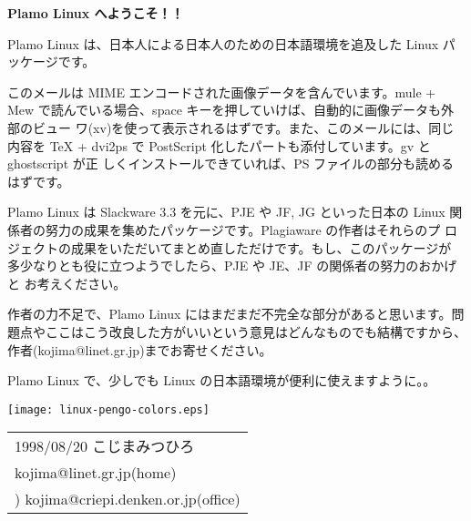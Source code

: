 \documentclass{jarticle}
\begin{document}
\begin{center}
{\Large \bf Plamo Linux へようこそ！！}
\end{center}

Plamo Linux は、日本人による日本人のための日本語環境を追及した 
Linux パッケージです。

このメールは MIME エンコードされた画像データを含んでいます。mule + Mew 
で読んでいる場合、space キーを押していけば、自動的に画像データも外部のビュー
ワ(xv)を使って表示されるはずです。また、このメールには、同じ内容を TeX +
dvi2ps で PostScript 化したパートも添付しています。gv と ghostscript が正
しくインストールできていれば、PS ファイルの部分も読めるはずです。

Plamo Linux は Slackware 3.3 を元に、PJE や JF, JG といった日本の Linux 
関係者の努力の成果を集めたパッケージです。Plagiaware の作者はそれらのプ
ロジェクトの成果をいただいてまとめ直しただけです。もし、このパッケージが
多少なりとも役に立つようでしたら、PJE や JE、JF の関係者の努力のおかげと
お考えください。

作者の力不足で、Plamo Linux にはまだまだ不完全な部分があると思います。問
題点やここはこう改良した方がいいという意見はどんなものでも結構ですから、
作者(kojima@linet.gr.jp)までお寄せください。

Plamo Linux で、少しでも Linux の日本語環境が便利に使えますように。。

\texttt{[image: linux-pengo-colors.eps]}
\begin{flushright}
\begin{tabular}{l}
1998/08/20   こじまみつひろ \\
kojima@linet.gr.jp(home) \\)
kojima@criepi.denken.or.jp(office) \\
\end{tabular}
\end{flushright}
\end{document}
